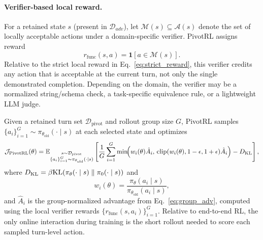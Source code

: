 \paragraph{Verifier-based local reward.}
For a retained state $s$ (present in $\mathcal{D}_{adv}$), let $\mathcal{M}(s)\subseteq \mathcal{A}(s)$ denote the set of locally acceptable actions under a domain-specific verifier. PivotRL assigns reward
\begin{equation}
r_{\mathrm{func}}(s,a)=\mathbf{1}[a\in \mathcal{M}(s)].
\label{eq:func_reward}
\end{equation}
Relative to the strict local reward in Eq.~\eqref{eq:strict_reward}, this verifier credits any action that is acceptable at the current turn, not only the single demonstrated completion. Depending on the domain, the verifier may be a normalized string/schema check, a task-specific equivalence rule, or a lightweight LLM judge.

Given a retained turn set $\mathcal{D}_{\mathrm{pivot}}$ and rollout group size $G$, PivotRL samples $\{a_i\}_{i=1}^G \sim \pi_{\theta_{\mathrm{old}}}(\cdot\mid s)$ at each selected state and optimizes
\begin{equation}
\mathcal{J}_{\mathrm{PivotRL}}(\theta)
=
\mathbb{E}_{\substack{
s\sim \mathcal{D}_{\mathrm{pivot}}\\
\{a_i\}_{i=1}^G \sim \pi_{\theta_{\mathrm{old}}}(\cdot\mid s)
}}
\left[
\frac{1}{G}
\sum_{i=1}^G
\min\!\Bigl(
w_i(\theta)\hat{A}_i,\,
\mathrm{clip}(w_i(\theta),1-\epsilon,1+\epsilon)\hat{A}_i
\Bigr)
- D_{\text{KL}}
\right],
\label{eq:pivotrl_obj}
\end{equation}
where $D_{\text{KL}} = \beta \mathrm{KL}(\pi_\theta(\cdot \mid s) \parallel \pi_0(\cdot \mid s))$ and
\begin{equation}
w_i(\theta)
=
\frac{\pi_\theta(a_i\mid s)}{\pi_{\theta_{\mathrm{old}}}(a_i\mid s)},
\label{eq:importance_weight}
\end{equation}
and $\hat{A}_i$ is the group-normalized advantage from Eq.~\eqref{eq:group_adv}, computed using the local verifier rewards $\{r_{\mathrm{func}}(s,a_i)\}_{i=1}^G$. Relative to end-to-end RL, the only online interaction during training is the short rollout needed to score each sampled turn-level action.


